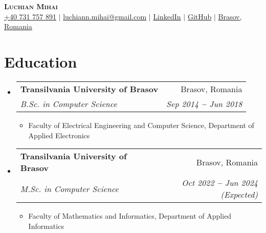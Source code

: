 \documentclass[letterpaper,11pt]{article}
\makeatletter
\newcommand{\resumeItem}[1]{
  \item\small{
    {#1 \vspace{-2pt}}
  }
}
\newcommand{\resumeSubheading}[4]{
  \vspace{-2pt}\item
    \begin{tabular*}{0.97\textwidth}[t]{l@{\extracolsep{\fill}}r}
      \textbf{#1} & #2 \\
      \textit{\small#3} & \textit{\small #4} \\
    \end{tabular*}\vspace{-7pt}
}
\newcommand{\resumeSubHeadingListStart}{\begin{itemize}[leftmargin=0.15in, label={}]}
\newcommand{\resumeSubHeadingListEnd}{\end{itemize}}
\newcommand{\resumeItemListStart}{\begin{itemize}}
\newcommand{\resumeItemListEnd}{\end{itemize}\vspace{-5pt}}
\makeatother
\begin{document}

\begin{center}
    \textbf{\Huge \scshape Luchian Mihai} \\ \vspace{3pt}
    \small
    \faMobile \hspace{.5pt} \href{tel:+40731757891}{+40 731 757 891}
    $|$
    \faAt \hspace{.5pt} \href{mailto:luchiann.mihai@gmail.com}{luchiann.mihai@gmail.com}
    $|$
    \faLinkedinSquare \hspace{.5pt} \href{https://www.linkedin.com/in/luchian-mihai}{LinkedIn}
    $|$
    \faGithub \hspace{.5pt} \href{https://github.com/LuchianMihai}{GitHub}
    $|$
    \faMapMarker \hspace{.5pt} \href{https://www.google.com/maps/place/Bra%C8%99ov/@45.6525685,25.5140627,12z/data=!3m1!4b1!4m6!3m5!1s0x40b35b862aa214f1:0x6cf5f2ef54391e0f!8m2!3d45.6426802!4d25.5887252!16zL20vMGhqdGc?entry=ttu}{Brasov, Romania}
\end{center}




\section{Education}
  \vspace{3pt}
  \resumeSubHeadingListStart
    
    \resumeSubheading
      {Transilvania University of Brasov}{Brasov, Romania}
      {B.Sc. in Computer Science}{Sep 2014 \textbf{--} Jun 2018}
         \resumeItemListStart
             \resumeItem{Faculty of Electrical Engineering and Computer Science, Department of Applied Electronics}
         \resumeItemListEnd

    \resumeSubheading
      {Transilvania University of Brasov}{Brasov, Romania}
      {M.Sc. in Computer Science}{Oct 2022 \textbf{--} Jun 2024 (Expected)}
         \resumeItemListStart
             \resumeItem{Faculty of Mathematics and Informatics, Department of Applied Informatics}
         \resumeItemListEnd
    
  \resumeSubHeadingListEnd


\end{document}
